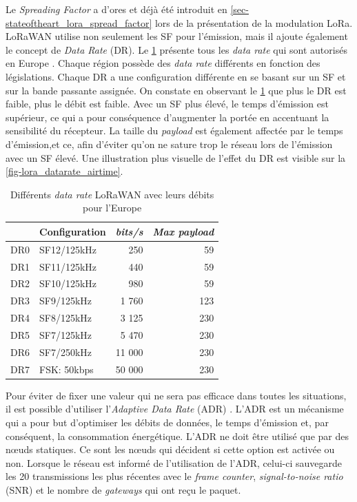 Le \textit{Spreading Factor} a d'ores et déjà été introduit en \cref{sec-stateoftheart_lora_spread_factor} lors de la présentation de la modulation LoRa. LoRaWAN utilise non seulement les SF pour l'émission, mais il ajoute également le concept de \textit{Data Rate} (DR). Le \cref{tab-datarate_eu} présente tous les \textit{data rate} qui sont autorisés en Europe \cite{Explorat95:online}. Chaque région possède des \textit{data rate} différents en fonction des législations. Chaque DR a une configuration différente en se basant sur un SF et sur la bande passante assignée. On constate en observant le \cref{tab-datarate_eu} que plus le DR est faible, plus le débit est faible. Avec un SF plus élevé, le temps d'émission est supérieur, ce qui a pour conséquence d'augmenter la portée en accentuant la sensibilité du récepteur. La taille du \textit{payload} est également affectée par le temps d'émission,et ce, afin d'éviter qu'on ne sature trop le réseau lors de l'émission avec un SF élevé. Une illustration plus visuelle de l'effet du DR est visible sur la \cref{fig-lora_datarate_airtime}.


\begin{table}[ht!]
\centering
\caption{Différents \textit{data rate} LoRaWAN avec leurs débits pour l'Europe}
\label{tab-datarate_eu}
\begin{tabular}{|l|l|r|r|}
\hline
\rowcolor[HTML]{BBDAFF} 
\multicolumn{1}{|c|}{\cellcolor[HTML]{BBDAFF}\textit{\textbf{Data Rate}}} & \multicolumn{1}{c|}{\cellcolor[HTML]{BBDAFF}\textbf{Configuration}} & \multicolumn{1}{c|}{\cellcolor[HTML]{BBDAFF}\textit{\textbf{bits/s}}} & \multicolumn{1}{c|}{\cellcolor[HTML]{BBDAFF}\textit{\textbf{Max payload}}} \\ \hline
DR0 & SF12/125kHz & 250 & 59 \\ \hline
DR1 & SF11/125kHz & 440 & 59 \\ \hline
DR2 & SF10/125kHz & 980 & 59 \\ \hline
DR3 & SF9/125kHz & 1 760 & 123 \\ \hline
DR4 & SF8/125kHz & 3 125 & 230 \\ \hline
DR5 & SF7/125kHz & 5 470 & 230 \\ \hline
DR6 & SF7/250kHz & 11 000 & 230 \\ \hline
DR7 & FSK: 50kbps & 50 000 & 230 \\ \hline
\end{tabular}
\end{table}


Pour éviter de fixer une valeur qui ne sera pas efficace dans toutes les situations, il est possible d'utiliser l'\textit{Adaptive Data Rate} (ADR) \cite{HomeTheT94:online}. L'ADR est un mécanisme qui a pour but d'optimiser les débits de données, le temps d'émission et, par conséquent, la consommation énergétique. L'ADR ne doit être utilisé que par des n\oe uds statiques. Ce sont les n\oe uds qui décident si cette option est activée ou non. Lorsque le réseau est informé de l'utilisation de l'ADR, celui-ci sauvegarde les 20 transmissions les plus récentes avec le \textit{frame counter}, \textit{signal-to-noise ratio} (SNR) et le nombre de \textit{gateways} qui ont reçu le paquet.

